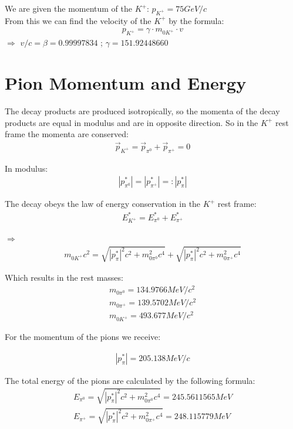 \documentclass[a4paper,parskip,11pt, DIV12]{scrreprt}
\begin{document}
We are given the momentum of the $K^+$: $p_{K^+} = 75 GeV/c$\\
From this we can find the velocity of the $K^+$ by the formula:
\begin{align*}
p_{K^+} = \gamma \cdot m_{0K^+} \cdot v
\end{align*}
$\Rightarrow$
$v/c = \beta = 0.99997834$ ;
$\gamma = 151.92448660$\\

\section{Pion Momentum and Energy} \label{sec:pE}

The decay products are produced isotropically, so the momenta of the decay products are equal in modulus and are in opposite direction. 
So in the $K^+$ rest frame the momenta are conserved:
\begin{align*}
\overrightarrow{p}_{K^+} = \overrightarrow{p}_{\pi^0} + \overrightarrow{p}_{\pi^+} = 0
\end{align*}

In modulus:
\begin{align*}
|p^*_{\pi^0}| = |p^*_{\pi^+}| =: |p^*_{\pi}|
\end{align*}

The decay obeys the law of energy conservation in the $K^+$ rest frame:
\begin{align*}
E^*_{K^+} = E^*_{\pi^0} + E^*_{\pi^+}
\end{align*}

$\Rightarrow$
\begin{align*}
m_{0K^+}c^2 = \sqrt{|p^*_{\pi}|^2c^2 + m_{0\pi^0}^2c^4} + \sqrt{|p^*_{\pi}|^2c^2 + m_{0\pi^+}^2c^4}
\end{align*}

Which results in the rest masses:
\begin{align*}
m_{0\pi^0} = 134.9766 MeV/c^2\\
m_{0\pi^+} = 139.5702 MeV/c^2\\
m_{0K^+} = 493.677 MeV/c^2
\end{align*}

For the momentum of the pions we receive:

\begin{align*}
|p^*_{\pi}| = 205.138 MeV/c
\end{align*}

The total energy of the pions are calculated by the following formula:
\begin{align*}
E_{\pi^0} = \sqrt{|p^*_{\pi}|^2c^2 + m_{0\pi^0}^2c^4} = 245.5611565 MeV\\
E_{\pi^+} = \sqrt{|p^*_{\pi}|^2c^2 + m_{0\pi^+}^2c^4}= 248.115779 MeV
\end{align*}


\clearpage  

\end{document}
